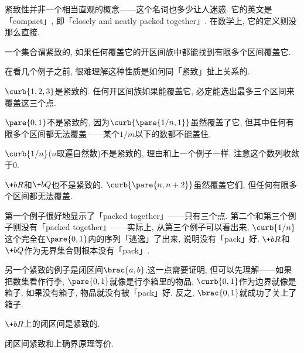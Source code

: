 \documentclass[hidelinks]{ctexart}
\begin{document}
紧致性并非一个相当直观的概念——这个名词也多少让人迷惑. 它的英文是「compact」, 即「closely and neatly packed together」. 在数学上, 它的定义则没那么直接.
\begin{definition}[紧致性]
    \label{def:紧致性}
    一个集合谓紧致的, 如果任何覆盖它的开区间族中都能找到有限多个区间覆盖它.
\end{definition}
在看几个例子之前, 很难理解这种性质是如何同「紧致」扯上关系的.
\begin{sample}
    \begin{ex}
        $\curb{1,2,3}$是紧致的. 任何开区间族如果能覆盖它, 必定能选出最多三个区间来覆盖这三个点.
    \end{ex}
    \begin{ex}
        $\pare{0,1}$不是紧致的, 因为$\curb{\pare{1/n,1}}$虽然覆盖了它, 但其中任何有限多个区间都无法覆盖——某个$1/m$以下的数都不能盖住.
    \end{ex}
    \begin{ex}
        $\curb{1/n}$($n$取遍自然数)不是紧致的, 理由和上一个例子一样. 注意这个数列收敛于$0$.
    \end{ex}
    \begin{ex}
        ${\+bR}$和${\+bQ}$也不是紧致的. $\curb{\pare{n,n+2}}$虽然覆盖它们, 但任何有限多个区间都无法覆盖.
    \end{ex}
\end{sample}
第一个例子很好地显示了「packed together」——只有三个点. 第二个和第三个例子则没有「packed together」——实际上, 从第三个例子可以看出来, $\curb{1/n}$这个完全在$\pare{0,1}$内的序列「逃逸」了出来, 说明没有「pack」好. $\+bR$和$\+bQ$作为无界集合则根本没有「pack」.
\par
另一个紧致的例子是闭区间$\brac{a,b}$.这一点需要证明, 但可以先理解——如果把数集看作行李, $\pare{0,1}$就像是行李箱里的物品, $\curb{0,1}$作为边界就像是箱子. 如果没有箱子, 物品就没有被「pack」好. 反之, $\brac{0,1}$就成功了关上了箱子.
\begin{finale}
    \begin{theorem}[闭区间紧致]
        $\+bR$上的闭区间是紧致的.
    \end{theorem}
    \begin{theorem}[等价性]
        闭区间紧致和上确界原理等价.
    \end{theorem}
\end{finale}
\end{document}
